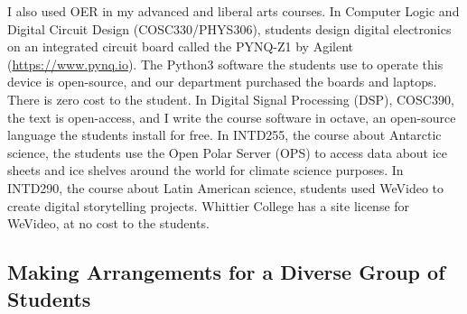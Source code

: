 \documentclass[../../../main.tex]{subfiles}
\begin{document}
I also used OER in my advanced and liberal arts courses.  In Computer Logic and Digital Circuit Design (COSC330/PHYS306), students design digital electronics on an integrated circuit board called the PYNQ-Z1 by Agilent (\url{https://www.pynq.io}).  The Python3 software the students use to operate this device is open-source, and our department purchased the boards and laptops.  There is zero cost to the student.  In Digital Signal Processing (DSP), COSC390, the text is open-access, and I write the course software in octave, an open-source language the students install for free.  In INTD255, the course about Antarctic science, the students use the Open Polar Server (OPS) to access data about ice sheets and ice shelves around the world for climate science purposes.  In INTD290, the course about Latin American science, students used WeVideo to create digital storytelling projects.  Whittier College has a site license for WeVideo, at no cost to the students.

\subsection{Making Arrangements for a Diverse Group of Students}
\label{sec:arrange}
\end{document}

